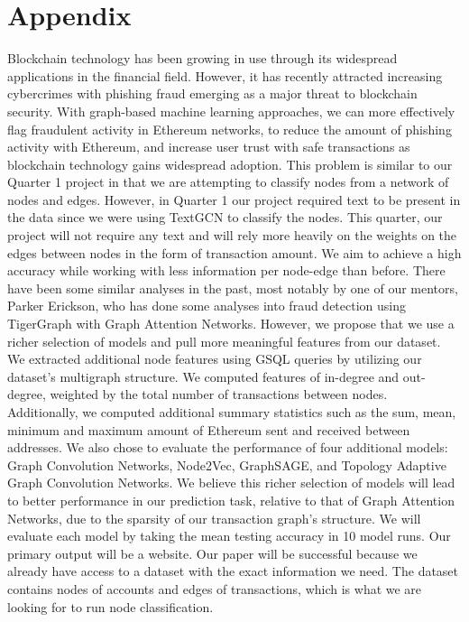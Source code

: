 \documentclass{article}
\begin{document}
\section{Appendix}
	Blockchain technology has been growing in use through its widespread applications in the financial field. However, it has recently attracted increasing cybercrimes with phishing fraud emerging as a major threat to blockchain security. With graph-based machine learning approaches, we can more effectively flag fraudulent activity in Ethereum networks, to reduce the amount of phishing activity with Ethereum, and increase user trust with safe transactions as blockchain technology gains widespread adoption. This problem is similar to our Quarter 1 project in that we are attempting to classify nodes from a network of nodes and edges. However, in Quarter 1 our project required text to be present in the data since we were using TextGCN to classify the nodes. This quarter, our project will not require any text and will rely more heavily on the weights on the edges between nodes in the form of transaction amount. We aim to achieve a high accuracy while working with less information per node-edge than before. There have been some similar analyses in the past, most notably by one of our mentors, Parker Erickson, who has done some analyses into fraud detection using TigerGraph with Graph Attention Networks. However, we propose that we use a richer selection of models and pull more meaningful features from our dataset. We extracted additional node features using GSQL queries by utilizing our dataset’s multigraph structure. We computed features of in-degree and out-degree, weighted by the total number of transactions between nodes. Additionally, we computed additional summary statistics such as the sum, mean, minimum and maximum amount of Ethereum sent and received between addresses. We also chose to evaluate the performance of four additional models: Graph Convolution Networks, Node2Vec, GraphSAGE, and Topology Adaptive Graph Convolution Networks. We believe this richer selection of models will lead to better performance in our prediction task, relative to that of Graph Attention Networks, due to the sparsity of our transaction graph’s structure. We will evaluate each model by taking the mean testing accuracy in 10 model runs. Our primary output will be a website. Our paper will be successful because we already have access to a dataset with the exact information we need. The dataset contains nodes of accounts and edges of transactions, which is what we are looking for to run node classification.
\end{document}
